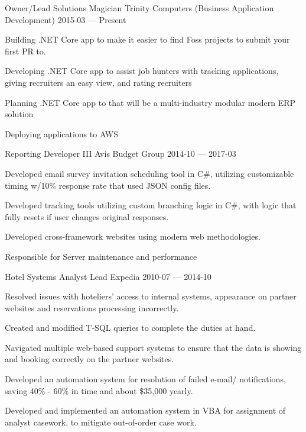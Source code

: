 \begin{cventries}
  \cventry
    {Owner/Lead Solutions Magician} %
    {Trinity Computers (Business Application Development)} %
    {} %
    {2015-03 — Present} %
    {
      \begin{cvitems} %
        \item {Building .NET Core app to make it easier to find Foss projects to submit your first PR to. }
        \item {Developing .NET Core app to assist job hunters with tracking applications, giving recruiters an easy view, and rating recruiters}
        \item {Planning .NET Core app to that will be a multi-industry modular modern ERP solution }
        \item {Deploying applications to AWS}
      \end{cvitems}
    }


  \cventry
    {Reporting Developer III} %
    {Avis Budget Group} %
    {} %
    {2014-10 — 2017-03} %
    {
      \begin{cvitems} %
        \item {Developed email survey invitation scheduling tool in C\#, utilizing customizable timing w/10\% response rate that used JSON config files.}
        \item {Developed tracking tools utilizing custom branching logic in C\#, with logic that fully resets if user changes original responses. }
        \item {Developed cross-framework websites using modern web methodologies. }
        \item {Responsible for Server maintenance and performance}
      \end{cvitems}
    }


  \cventry
    {Hotel Systems Analyst Lead} %
    {Expedia} %
    {} %
    {2010-07 — 2014-10} %
    {
      \begin{cvitems} %
        \item {Resolved issues with hoteliers’ access to internal systems, appearance on partner websites and reservations processing incorrectly. }
        \item {Created and modified T-SQL queries to complete the duties at hand. }
        \item {Navigated multiple web-based support systems to ensure that the data is showing and booking correctly on the partner websites. }
        \item {Developed an automation system for resolution of failed e-mail/ notifications, saving 40\% - 60\% in time and about \$35,000 yearly.}
        \item {Developed and implemented an automation system in VBA for assignment of analyst casework, to mitigate out-of-order case work.}
      \end{cvitems}
    }



\end{cventries}
